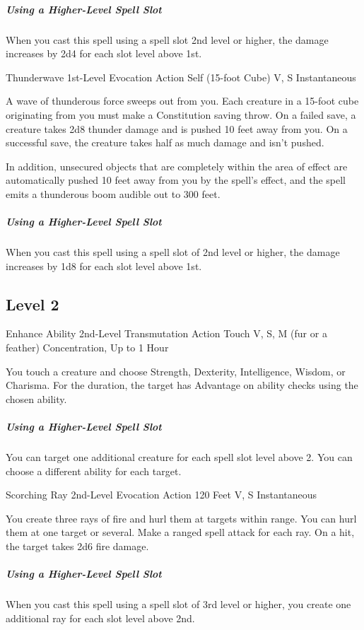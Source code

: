 \documentclass[letterpaper,openany,oneside,twocolumn]{book}
\begin{document}
\subparagraph*{Using a Higher-Level Spell Slot} When you cast this spell using a spell slot 2nd level or higher, the damage increases by 2d4 for each slot level above 1st.

\DndSpellHeader
  {Thunderwave}
  {1st-Level Evocation}
  {Action}
  {Self (15-foot Cube)}
  {V, S}
  {Instantaneous}

A wave of thunderous force sweeps out from you. Each creature in a 15-foot cube originating from you must make a Constitution saving throw. On a failed save, a creature takes 2d8 thunder damage and is pushed 10 feet away from you. On a successful save, the creature takes half as much damage and isn't pushed.

In addition, unsecured objects that are completely within the area of effect are automatically pushed 10 feet away from you by the spell's effect, and the spell emits a thunderous boom audible out to 300 feet.

\subparagraph*{Using a Higher-Level Spell Slot} When you cast this spell using a spell slot of 2nd level or higher, the damage increases by 1d8 for each slot level above 1st.

\subsection*{Level 2}

\DndSpellHeader
  {Enhance Ability}
  {2nd-Level Transmutation}
  {Action}
  {Touch}
  {V, S, M (fur or a feather)}
  {Concentration, Up to 1 Hour}

You touch a creature and choose Strength, Dexterity, Intelligence, Wisdom, or Charisma. For the duration, the target has Advantage on ability checks using the chosen ability.

\subparagraph*{Using a Higher-Level Spell Slot} You can target one additional creature for each spell slot level above 2. You can choose a different ability for each target.

\DndSpellHeader
  {Scorching Ray}
  {2nd-Level Evocation}
  {Action}
  {120 Feet}
  {V, S}
  {Instantaneous}

You create three rays of fire and hurl them at targets within range. You can hurl them at one target or several. Make a ranged spell attack for each ray. On a hit, the target takes 2d6 fire damage.

\subparagraph*{Using a Higher-Level Spell Slot} When you cast this spell using a spell slot of 3rd level or higher, you create one additional ray for each slot level above 2nd.
\end{document}
